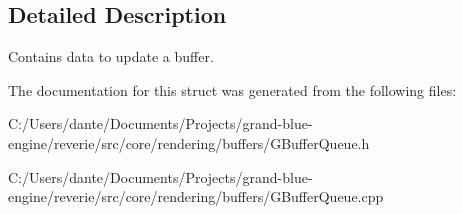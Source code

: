\subsection{Detailed Description}
Contains data to update a buffer. 

The documentation for this struct was generated from the following files\+:\begin{DoxyCompactItemize}
\item 
C\+:/\+Users/dante/\+Documents/\+Projects/grand-\/blue-\/engine/reverie/src/core/rendering/buffers/G\+Buffer\+Queue.\+h\item 
C\+:/\+Users/dante/\+Documents/\+Projects/grand-\/blue-\/engine/reverie/src/core/rendering/buffers/G\+Buffer\+Queue.\+cpp\end{DoxyCompactItemize}
